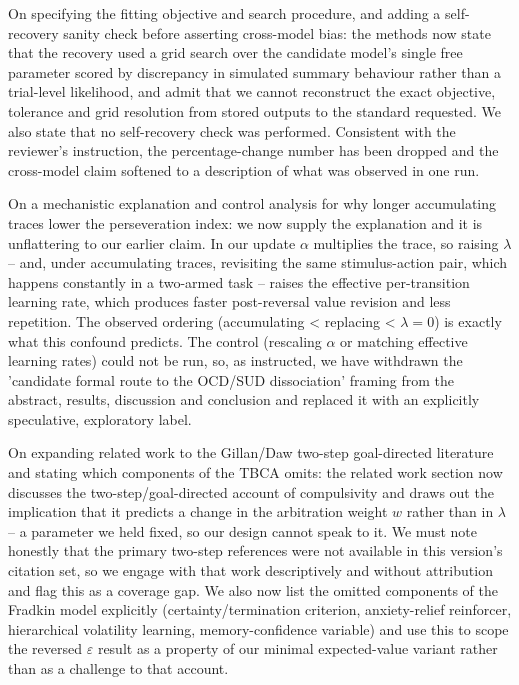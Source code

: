 \documentclass[11pt,a4paper]{article}
\begin{document}
On specifying the fitting objective and search procedure, and adding a self-recovery sanity check before asserting cross-model bias: the methods now state that the recovery used a grid search over the candidate model's single free parameter scored by discrepancy in simulated summary behaviour rather than a trial-level likelihood, and admit that we cannot reconstruct the exact objective, tolerance and grid resolution from stored outputs to the standard requested. We also state that no self-recovery check was performed. Consistent with the reviewer's instruction, the percentage-change number has been dropped and the cross-model claim softened to a description of what was observed in one run.

On a mechanistic explanation and control analysis for why longer accumulating traces lower the perseveration index: we now supply the explanation and it is unflattering to our earlier claim. In our update $\alpha$ multiplies the trace, so raising $\lambda$ -- and, under accumulating traces, revisiting the same stimulus-action pair, which happens constantly in a two-armed task -- raises the effective per-transition learning rate, which produces faster post-reversal value revision and less repetition. The observed ordering (accumulating \textless{} replacing \textless{} $\lambda=0$) is exactly what this confound predicts. The control (rescaling $\alpha$ or matching effective learning rates) could not be run, so, as instructed, we have withdrawn the 'candidate formal route to the OCD/SUD dissociation' framing from the abstract, results, discussion and conclusion and replaced it with an explicitly speculative, exploratory label.

On expanding related work to the Gillan/Daw two-step goal-directed literature and stating which components of \citet{fradkin2020searching} the TBCA omits: the related work section now discusses the two-step/goal-directed account of compulsivity and draws out the implication that it predicts a change in the arbitration weight $w$ rather than in $\lambda$ -- a parameter we held fixed, so our design cannot speak to it. We must note honestly that the primary two-step references were not available in this version's citation set, so we engage with that work descriptively and without attribution and flag this as a coverage gap. We also now list the omitted components of the Fradkin model explicitly (certainty/termination criterion, anxiety-relief reinforcer, hierarchical volatility learning, memory-confidence variable) and use this to scope the reversed $\varepsilon$ result as a property of our minimal expected-value variant rather than as a challenge to that account.
\end{document}
